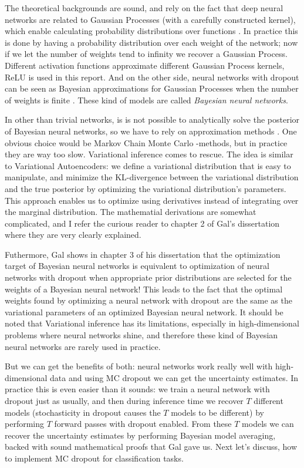 \documentclass[11pt]{article}
\begin{document}
The theoretical backgrounds are sound, and rely on the fact that deep neural networks are related to Gaussian Processes (with a carefully constructed kernel), which enable calculating probability distributions over functions \cite{gal2016uncertainty}. In practice this is done by having a probability distribution over each weight of the network; now if we let the number of weights tend to infinity we recover a Gaussian Process. Different activation functions approximate different Gaussian Process kernels, ReLU is used in this report. And on the other side, neural networks with dropout can be seen as Bayesian approximations for Gaussian Processes when the number of weights is finite \cite{gal2016dropout}. These kind of models are called \textit{Bayesian neural networks}.

In other than trivial networks, is is not possible to analytically solve the posterior of Bayesian neural networks, so we have to rely on approximation methods \cite{gal2016uncertainty}. One obvious choice would be Markov Chain Monte Carlo -methods, but in practice they are way too slow. Variational inference comes to rescue. The idea is similar to Variational Autoencoders: we define a variational distribution that is easy to manipulate, and minimize the KL-divergence between the variational distribution and the true posterior by optimizing the variational distribution's parameters. This approach enables us to optimize using derivatives instead of integrating over the marginal distribution. The mathematial derivations are somewhat complicated, and I refer the curious reader to chapter 2 of Gal's dissertation \cite{gal2016uncertainty} where they are very clearly explained.

Futhermore, Gal shows in chapter 3 of his dissertation \cite{gal2016uncertainty} that the optimization target of Bayesian neural networks is equivalent to optimization of neural networks with dropout when appropriate prior distributions are selected for the weights of a Bayesian neural network! This leads to the fact that the optimal weights found by optimizing a neural network with dropout are the same as the variational parameters of an optimized Bayesian neural network. It should be noted that Variational inference has its limitations, especially in high-dimensional problems where neural networks shine, and therefore these kind of Bayesian neural networks are rarely used in practice.

But we can get the benefits of both: neural networks work really well with high-dimensional data and using MC dropout we can get the uncertainty estimates. In practice this is even easier than it sounds: we train a neural network with dropout just as usually, and then during inference time we recover $T$ different models (stochasticity in dropout causes the $T$ models to be different) by performing $T$ forward passes with dropout enabled. From these $T$ models we can recover the uncertainty estimates by performing Bayesian model averaging, backed with sound mathematical proofs that Gal \cite{gal2016uncertainty} gave us. Next let's discuss, how to implement MC dropout for classification tasks.
\end{document}
